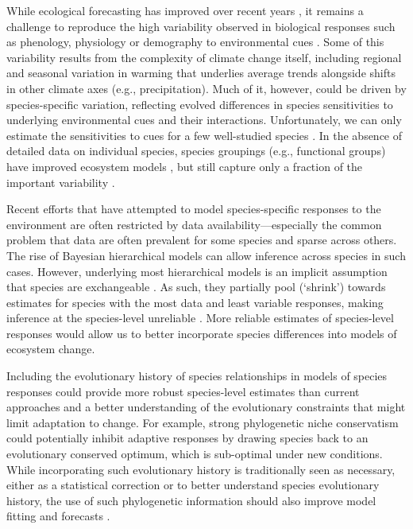 \documentclass[11pt]{article}
\begin{document}
\par While ecological forecasting has improved over recent years \citep{dietze2017ecological,lewis2022power}, it remains a challenge to reproduce the high variability observed in biological responses such as phenology, physiology or demography to environmental cues \citep{IPCC:2014sm}. Some of this variability results from the complexity of climate change itself, including regional and seasonal variation in warming that underlies average trends alongside shifts in other climate axes (e.g.,  precipitation). Much of it, however, could be driven by species-specific variation, reflecting evolved differences in species sensitivities to underlying environmental cues and their interactions. Unfortunately, we can only estimate the sensitivities to cues for a few well-studied species \citep{chuinearees,ettinger2020}. In the absence of detailed data on individual species, species groupings (e.g., functional groups) have improved ecosystem models \citep{ed2001,griffith2020}, but still capture only a fraction of the important variability \citep{fuccillo2022}.

\par Recent efforts that have attempted to model species-specific responses to the environment \citep{diez2012forecasting} are often restricted by data availability---especially the common problem that data are often prevalent for some species and sparse across others. The rise of Bayesian hierarchical models can allow inference across species in such cases. However, underlying most hierarchical models is an implicit assumption that species are exchangeable \citep[all species represent samples drawn from the same underlying distribution,][]{gelman2006}. As such, they partially pool (`shrink') towards estimates for species with the most data and least variable responses, making inference at the species-level unreliable \citep{ettinger2020}. More reliable estimates of species-level responses would allow us to better incorporate species differences into models of ecosystem change. 

\par Including the evolutionary history of species relationships in models of species responses could provide more robust species-level estimates than current approaches and a better understanding of the evolutionary constraints that might limit adaptation to change. For example, strong phylogenetic niche conservatism \citep{wiens2010niche} could potentially inhibit adaptive responses by drawing species back to an evolutionary conserved optimum, which is sub-optimal under new conditions. While incorporating such evolutionary history is traditionally seen as necessary, either as a statistical correction or to better understand species evolutionary history, the use of such phylogenetic information should also improve model fitting and forecasts \citep{freckleton2002phylogenetic}.
\end{document}
